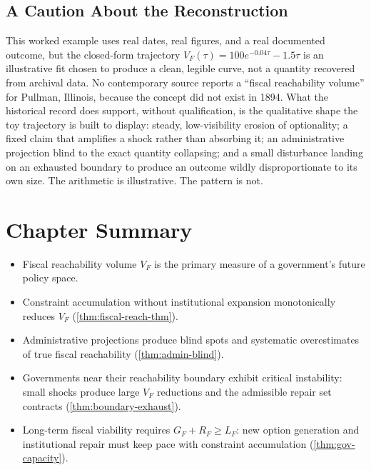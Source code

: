 \documentclass[12pt,twoside,openright]{book}
\newenvironment{chapsummary}{%
  \begin{tcolorbox}[colback=DistBlue!5,colframe=DistBlue,
    title={\faBookOpen\enspace Summary},
    fonttitle=\sffamily\bfseries\color{white},
    attach boxed title to top left={yshift=-2mm,xshift=4mm},
    boxed title style={colback=DistBlue,rounded corners}]
  \begin{itemize}[nosep,leftmargin=*]}{%
  \end{itemize}\end{tcolorbox}}
\begin{document}
\subsection{A Caution About the Reconstruction}

This worked example uses real dates, real figures, and a real
documented outcome, but the closed-form trajectory
$V_F(\tau) = 100e^{-0.04\tau} - 1.5\tau$ is an illustrative
fit chosen to produce a clean, legible curve, not a quantity
recovered from archival data. No contemporary source reports a
``fiscal reachability volume'' for Pullman, Illinois, because the
concept did not exist in 1894. What the historical record does
support, without qualification, is the qualitative shape the toy
trajectory is built to display: steady, low-visibility erosion
of optionality; a fixed claim that amplifies a shock rather than
absorbing it; an administrative projection blind to the exact
quantity collapsing; and a small disturbance landing on an
exhausted boundary to produce an outcome wildly disproportionate
to its own size. The arithmetic is illustrative. The pattern is
not.

\section*{Chapter Summary}
\begin{chapsummary}
  \item Fiscal reachability volume $V_F$ is the primary
        measure of a government's future policy space.
  \item Constraint accumulation without institutional
        expansion monotonically reduces $V_F$
        (\cref{thm:fiscal-reach-thm}).
  \item Administrative projections produce blind spots
        and systematic overestimates of true fiscal
        reachability (\cref{thm:admin-blind}).
  \item Governments near their reachability boundary
        exhibit critical instability: small shocks
        produce large $V_F$ reductions and the
        admissible repair set contracts
        (\cref{thm:boundary-exhaust}).
  \item Long-term fiscal viability requires
        $G_F + R_F \ge L_F$: new option generation
        and institutional repair must keep pace with
        constraint accumulation
        (\cref{thm:gov-capacity}).
\end{chapsummary}
\end{document}
